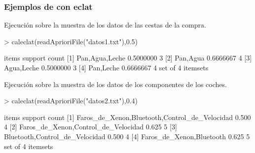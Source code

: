 \documentclass [a4paper] {article}
\begin{document}
\subsubsection{Ejemplos de con eclat}
Ejecución sobre la muestra de los datos de las cestas de la compra.
\begin{Schunk}
\begin{Sinput}
> caleclat(readAprioriFile("datos1.txt"),0.5)
\end{Sinput}
\begin{Soutput}
    items            support   count
[1] {Pan,Agua,Leche} 0.5000000 3    
[2] {Pan,Agua}       0.6666667 4    
[3] {Agua,Leche}     0.5000000 3    
[4] {Pan,Leche}      0.6666667 4    
set of 4 itemsets 
\end{Soutput}
\end{Schunk}

Ejecución sobre la muestra de los datos de los componentes de los coches.
\begin{Schunk}
\begin{Sinput}
> caleclat(readAprioriFile("datos2.txt"),0.4)
\end{Sinput}
\begin{Soutput}
    items                                           support count
[1] {Faros_de_Xenon,Bluetooth,Control_de_Velocidad} 0.500   4    
[2] {Faros_de_Xenon,Control_de_Velocidad}           0.625   5    
[3] {Bluetooth,Control_de_Velocidad}                0.500   4    
[4] {Faros_de_Xenon,Bluetooth}                      0.625   5    
set of 4 itemsets 
\end{Soutput}
\end{Schunk}
\end{document}
